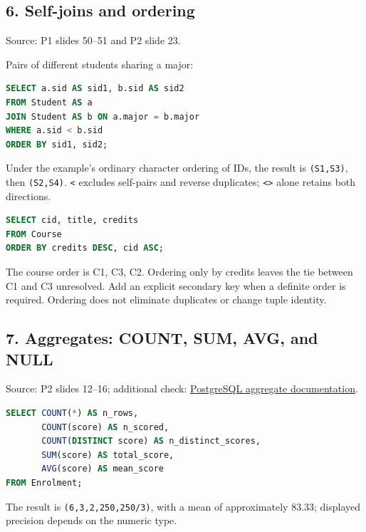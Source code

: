 \subsection{6. Self-joins and ordering}\label{06_sql_queries_en-self-joins-and-ordering}

Source: P1 slides 50--51 and P2 slide 23.

Pairs of different students sharing a major:

\Needspace{105pt}
\begin{lstlisting}[language=SQL]
SELECT a.sid AS sid1, b.sid AS sid2
FROM Student AS a
JOIN Student AS b ON a.major = b.major
WHERE a.sid < b.sid
ORDER BY sid1, sid2;
\end{lstlisting}

Under the example's ordinary character ordering of IDs, the result is \texttt{(\allowbreak{}S1,\allowbreak{}S3)\allowbreak{}}, then \texttt{(\allowbreak{}S2,\allowbreak{}S4)\allowbreak{}}. \texttt{\textless{}} excludes self-pairs and reverse duplicates; \texttt{\textless{}\textgreater{}} alone retains both directions.

\Needspace{75pt}
\begin{lstlisting}[language=SQL]
SELECT cid, title, credits
FROM Course
ORDER BY credits DESC, cid ASC;
\end{lstlisting}

The course order is C1, C3, C2. Ordering only by credits leaves the tie between C1 and C3 unresolved. Add an explicit secondary key when a definite order is required. Ordering does not eliminate duplicates or change tuple identity.

\subsection{7. Aggregates: COUNT, SUM, AVG, and NULL}\label{06_sql_queries_en-aggregates-count-sum-avg-and-null}

Source: P2 slides 12--16; additional check: \href{https://www.postgresql.org/docs/18/functions-aggregate.html}{PostgreSQL aggregate documentation}.

\Needspace{120pt}
\begin{lstlisting}[language=SQL]
SELECT COUNT(*) AS n_rows,
       COUNT(score) AS n_scored,
       COUNT(DISTINCT score) AS n_distinct_scores,
       SUM(score) AS total_score,
       AVG(score) AS mean_score
FROM Enrolment;
\end{lstlisting}

The result is \texttt{(\allowbreak{}6,\allowbreak{}3,\allowbreak{}2,\allowbreak{}250,\allowbreak{}250/\allowbreak{}3)\allowbreak{}}, with a mean of approximately 83.33; displayed precision depends on the numeric type.

